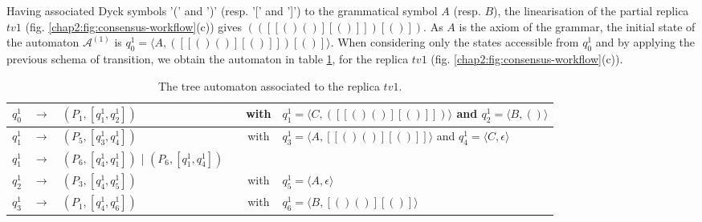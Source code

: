 Having associated Dyck symbols '(' and ')' (resp. '[' and ']') to the grammatical symbol $A$ (resp. $B$), the linearisation of the partial replica $tv1$ (fig. \ref{chap2:fig:consensus-workflow}(c)) gives $(([[()()][()]])[()])$. As $A$ is the axiom of the grammar, the initial state of the automaton $\mathcal{A}^{(1)}$ is $q_{0}^{1}=\langle A,([[()()][()]])[()] \rangle$. When considering only the  states accessible from $q_{0}^{1}$ and by applying the previous schema of transition, we obtain the automaton in table \ref{chap2:table:automaton-a-b}, for the replica $tv1$ (fig. \ref{chap2:fig:consensus-workflow}(c)).
\begin{table}[ht]
	\caption{The tree automaton associated to the replica $tv1$.}
	\label{chap2:table:automaton-a-b}
	\begin{tabular}[t]{|lcp{5.7cm}|lcp{5cm}|}
	\hline
	$q_{0}^{1}$ & $\longrightarrow$ & $(P_{1}, [q_{1}^{1}, q_{2}^{1}])$ & & with & $q_{1}^{1}=\langle C,([[()()][()]]) \rangle$ and $q_{2}^{1}=\langle B,() \rangle$\\
	
	\hline
	$q_{1}^{1}$ & $\longrightarrow$ & $(P_{5}, [q_{3}^{1}, q_{4}^{1}])$ & & with & $q_{3}^{1}=\langle A,[[()()][()]] \rangle$ and $q_{4}^{1}=\langle C,\epsilon \rangle$\\
	\hline
	
	$q_{1}^{1}$ & $\longrightarrow$ & $(P_{6}, [q_{4}^{1}, q_{1}^{1}])$ | $(P_{6}, [q_{1}^{1}, q_{4}^{1}])$ & & &\\
	\hline
	
	$q_{2}^{1}$ & $\longrightarrow$ & $(P_{3}, [q_{4}^{1}, q_{5}^{1}])$ & & with & $q_{5}^{1}=\langle A,\epsilon \rangle$\\
	\hline
	
	$q_{3}^{1}$ & $\longrightarrow$ & $(P_{1}, [q_{4}^{1}, q_{6}^{1}])$ & & with & $q_{6}^{1}=\langle B,[()()][()] \rangle$\\
	\hline
	

\end{tabular}
\end{table}
